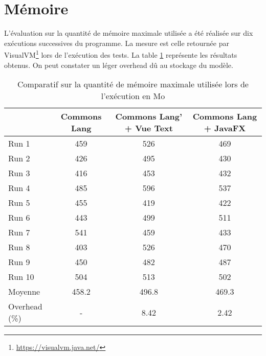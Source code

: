 \section{Mémoire}
\label{memoire}

L'évaluation sur la quantité de mémoire maximale utilisée a été réalisée sur dix exécutions successives du programme. La mesure est celle retournée par VisualVM\footnote{\url{https://visualvm.java.net/}} lors de l'exécution des tests. La table \ref{evaluation_memoire} représente les résultats obtenus. On peut constater un léger overhead dû au stockage du modèle.

\begin{table}[H]
\centering
\begin{tabular}{|l|c|c|c|}
\hline
         & Commons Lang & Commons Lang' + Vue Text & Commons Lang + JavaFX\\
         \hline
Run 1     & 459  & 526       & 469        \\
Run 2     & 426  & 495       & 430        \\
Run 3     & 416  & 453       & 432        \\
Run 4     & 485  & 596       & 537        \\
Run 5     & 455  & 419       & 422        \\
Run 6     & 443  & 499       & 511        \\
Run 7     & 541  & 459       & 433        \\
Run 8     & 403  & 526       & 470        \\
Run 9     & 450  & 482       & 487        \\
Run 10    & 504  & 513       & 502        \\
\hline
Moyenne  & 458.2  & 496.8       & 469.3        \\
\hline
Overhead (\%) & -  & 8.42       & 2.42   \\
\hline    
\end{tabular}
\caption{Comparatif sur la quantité de mémoire maximale utilisée lors de l'exécution en Mo}
\label{evaluation_memoire}
\end{table}
